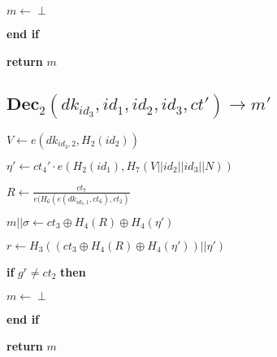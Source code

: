 \documentclass[a4paper]{article}
\begin{document}
\quad$m \gets \perp$

\textbf{end if}

\textbf{return} $m$

\subsection{$\textbf{Dec}_2(\textit{dk}_{\textit{id}_3}, \textit{id}_1, \textit{id}_2, \textit{id}_3, \textit{ct}') \rightarrow m'$}

$V \gets e(\textit{dk}_{\textit{id}_3, 2}, H_2(\textit{id}_2))$

$\eta' \gets \textit{ct}_4' \cdot e(H_2(\textit{id}_1), H_7(V || \textit{id}_2 || \textit{id}_3 || N))$

$R \gets \frac{\textit{ct}_7}{e(H_6(e(\textit{dk}_{\textit{id}_3, 1}, \textit{ct}_6), \textit{ct}_2)}$

$m || \sigma \gets \textit{ct}_3 \oplus H_4(R) \oplus H_4(\eta')$

$r \gets H_3((\textit{ct}_3 \oplus H_4(R) \oplus H_4(\eta')) || \eta')$

\textbf{if} $g^r \neq \textit{ct}_2$ \textbf{then}

\quad$m \gets \perp$

\textbf{end if}

\textbf{return} $m$
\end{document}
